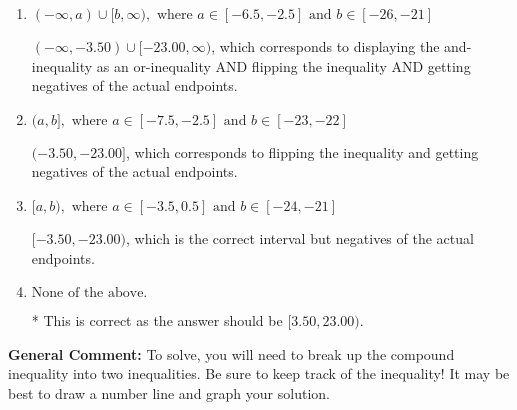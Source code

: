 \documentclass{extbook}[14pt]
\begin{document}
\begin{enumerate}
{\begin{enumerate}[label=\Alph*.]
$(-\infty, -3.50] \cup (-23.00, \infty)$, which corresponds to displaying the and-inequality as an or-inequality and getting negatives of the actual endpoints.
\item \( (-\infty, a) \cup [b, \infty), \text{ where } a \in [-6.5, -2.5] \text{ and } b \in [-26, -21] \)

$(-\infty, -3.50) \cup [-23.00, \infty)$, which corresponds to displaying the and-inequality as an or-inequality AND flipping the inequality AND getting negatives of the actual endpoints.
\item \( (a, b], \text{ where } a \in [-7.5, -2.5] \text{ and } b \in [-23, -22] \)

$(-3.50, -23.00]$, which corresponds to flipping the inequality and getting negatives of the actual endpoints.
\item \( [a, b), \text{ where } a \in [-3.5, 0.5] \text{ and } b \in [-24, -21] \)

$[-3.50, -23.00)$, which is the correct interval but negatives of the actual endpoints.
\item \( \text{None of the above.} \)

* This is correct as the answer should be $[3.50, 23.00)$.
\end{enumerate}

\textbf{General Comment:} To solve, you will need to break up the compound inequality into two inequalities. Be sure to keep track of the inequality! It may be best to draw a number line and graph your solution.
}
\end{enumerate}
\end{document}

